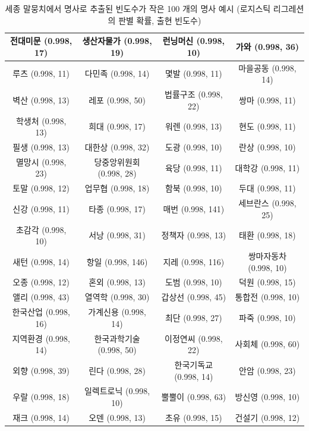 \documentclass[11pt]{article}
\begin{document}
\begin{table}[H]
\small
\centering
\caption{세종 말뭉치에서 명사로 추출된 빈도수가 작은 100 개의 명사 예시 (로지스틱 리그레션의 판별 확률, 출현 빈도수)}
\label{tab:sejong_infrequent_top100}
\begin{tabular}{|c|c|c|c|}
\hline
전대미문 (0.998, 17)   & 생산자물가 (0.998, 19)  & 런닝머신 (0.998, 10)  & 가와 (0.998, 36) \\ \hline
루츠 (0.998, 11)  & 다민족 (0.998, 14) & 몇발 (0.998, 11) & 마을공동 (0.998, 14)  \\ \hline
벽산 (0.998, 13)  & 레포 (0.998, 50)  & 법률구조 (0.998, 22)  & 쌍마 (0.998, 11) \\ \hline
학생처 (0.998, 13) & 희대 (0.998, 17)  & 워렌 (0.998, 13) & 현도 (0.998, 11) \\ \hline
필생 (0.998, 13)  & 대한상 (0.998, 32) & 도광 (0.998, 10) & 란상 (0.998, 10) \\ \hline
멸망시 (0.998, 23) & 당중앙위원회 (0.998, 28) & 육당 (0.998, 11) & 대학강 (0.998, 11)   \\ \hline
토말 (0.998, 12)  & 업무협 (0.998, 18) & 함북 (0.998, 10) & 두대 (0.998, 11) \\ \hline
신강 (0.998, 11)  & 타종 (0.998, 17)  & 매번 (0.998, 141)   & 세브란스 (0.998, 25)  \\ \hline
초감각 (0.998, 10) & 서낭 (0.998, 31)  & 정책자 (0.998, 13)   & 태환 (0.998, 18) \\ \hline
새턴 (0.998, 14)  & 항일 (0.998, 146) & 지레 (0.998, 116)   & 쌍마자동차 (0.998, 10) \\ \hline
오종 (0.998, 12)  & 혼외 (0.998, 13)  & 도범 (0.998, 10) & 덕원 (0.998, 15) \\ \hline
앨리 (0.998, 43)  & 열역학 (0.998, 30) & 갑상선 (0.998, 45)   & 통합전 (0.998, 10)   \\ \hline
한국산업 (0.998, 16)   & 가계신용 (0.998, 14)   & 최단 (0.998, 27) & 파죽 (0.998, 10) \\ \hline
지역환경 (0.998, 14)   & 한국과학기술 (0.998, 50) & 이정연씨 (0.998, 22)  & 사회체 (0.998, 60)   \\ \hline
외향 (0.998, 39)  & 린다 (0.998, 28)  & 한국기독교 (0.998, 14) & 안암 (0.998, 23) \\ \hline
우랄 (0.998, 18)  & 일렉트로닉 (0.998, 10)  & 뿔뿔이 (0.998, 63)   & 방신영 (0.998, 10)   \\ \hline
재크 (0.998, 14)  & 오덴 (0.998, 13)  & 초유 (0.998, 15) & 건설기 (0.998, 12)   \\ \hline

\end{tabular}
\end{table}
\end{document}
